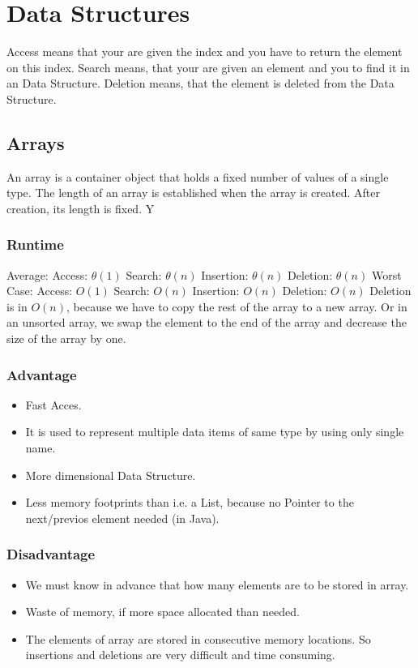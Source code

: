 \documentclass[12pt,a4paper]{article}
\newcommand{\RuntimeHead}{Runtime}
\newcommand{\AdvantageHead}{Advantage}
\newcommand{\DisadvantageHead}{Disadvantage}
\begin{document}
\tableofcontents
\newpage

\section{Data Structures}
Access means that your are given the index and you have to return the element on this index.
Search means, that your are given an element and you to find it in an Data Structure. 
Deletion means, that the element is deleted from the Data Structure.
\subsection{Arrays}
An array is a container object that holds a fixed number of values of a single type. The length of an array is established when the array is created. After creation, its length is fixed. Y
\subsubsection{\RuntimeHead}
Average: 
Access: $\theta(1)  $
Search: $\theta(n) $
Insertion: $ \theta(n)$
Deletion: $\theta (n)$
\newline
\newline
Worst Case: 
Access: $O(1)$  
Search: $O(n) $
Insertion: $O(n)$
Deletion: $O(n)$
\newline
\newline
Deletion is in $O(n)$, because we  have to copy the rest of the array to a new array. Or in an unsorted array, we swap the element to the end of the array and decrease the size of the array by one. 


\subsubsection{\AdvantageHead}
\begin{itemize}
\item Fast Acces.
\item It is used to represent multiple data items of same type by using only single name.
\item More dimensional Data Structure.
\item Less memory footprints than i.e. a List, because no Pointer to the next/previos element needed (in Java).
\end{itemize}
\subsubsection{\DisadvantageHead}
\begin{itemize}
\item We must know in advance that how many elements are to be stored in array.
\item Waste of memory, if more space allocated than needed.
\item The elements of array are stored in consecutive memory locations. So insertions and deletions are very difficult and time consuming.
\end{itemize}
\end{document}
